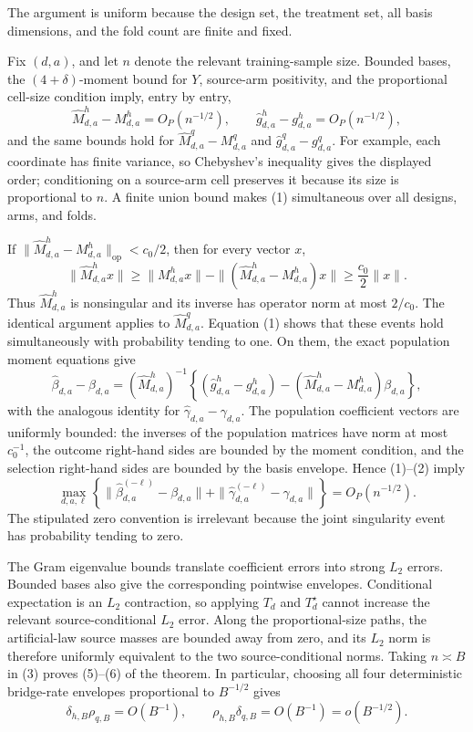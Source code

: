 The argument is uniform because the design set, the treatment set, all basis dimensions, and the fold count are finite and fixed.

Fix \((d,a)\), and let \(n\) denote the relevant training-sample size.  Bounded bases, the \((4+\delta)\)-moment bound for \(Y\), source-arm positivity, and the proportional cell-size condition imply, entry by entry,
\[
 \widehat M^h_{d,a}-M^h_{d,a}=O_P(n^{-1/2}),
 \qquad
 \widehat g^h_{d,a}-g^h_{d,a}=O_P(n^{-1/2}),                  \tag{1}
\]
and the same bounds hold for \(\widehat M^q_{d,a}-M^q_{d,a}\) and \(\widehat g^q_{d,a}-g^q_{d,a}\).  For example, each coordinate has finite variance, so Chebyshev's inequality gives the displayed order; conditioning on a source-arm cell preserves it because its size is proportional to \(n\).  A finite union bound makes (1) simultaneous over all designs, arms, and folds.

If \(\|\widehat M^h_{d,a}-M^h_{d,a}\|_{\mathrm{op}}<c_0/2\), then for every vector \(x\),
\[
 \|\widehat M^h_{d,a}x\|
 \ge \|M^h_{d,a}x\|
      -\|(\widehat M^h_{d,a}-M^h_{d,a})x\|
 \ge \frac{c_0}{2}\|x\|.
\]
Thus \(\widehat M^h_{d,a}\) is nonsingular and its inverse has operator norm at most \(2/c_0\).  The identical argument applies to \(\widehat M^q_{d,a}\).  Equation (1) shows that these events hold simultaneously with probability tending to one.  On them, the exact population moment equations give
\[
 \widehat\beta_{d,a}-\beta_{d,a}
 =(\widehat M^h_{d,a})^{-1}
 \left\{(\widehat g^h_{d,a}-g^h_{d,a})
 -(\widehat M^h_{d,a}-M^h_{d,a})\beta_{d,a}\right\},        \tag{2}
\]
with the analogous identity for \(\widehat\gamma_{d,a}-\gamma_{d,a}\).  The population coefficient vectors are uniformly bounded: the inverses of the population matrices have norm at most \(c_0^{-1}\), the outcome right-hand sides are bounded by the moment condition, and the selection right-hand sides are bounded by the basis envelope.  Hence (1)--(2) imply
\[
 \max_{d,a,\ell}\left\{
 \|\widehat\beta_{d,a}^{(-\ell)}-\beta_{d,a}\|
 +\|\widehat\gamma_{d,a}^{(-\ell)}-\gamma_{d,a}\|
 \right\}=O_P(n^{-1/2}).                                    \tag{3}
\]
The stipulated zero convention is irrelevant because the joint singularity event has probability tending to zero.

The Gram eigenvalue bounds translate coefficient errors into strong \(L_2\) errors.  Bounded bases also give the corresponding pointwise envelopes.  Conditional expectation is an \(L_2\) contraction, so applying \(T_d\) and \(T_d^\star\) cannot increase the relevant source-conditional \(L_2\) error.  Along the proportional-size paths, the artificial-law source masses are bounded away from zero, and its \(L_2\) norm is therefore uniformly equivalent to the two source-conditional norms.  Taking \(n\asymp B\) in (3) proves (5)--(6) of the theorem.  In particular, choosing all four deterministic bridge-rate envelopes proportional to \(B^{-1/2}\) gives
\[
 \delta_{h,B}\rho_{q,B}=O(B^{-1}),
 \qquad
 \rho_{h,B}\delta_{q,B}=O(B^{-1})=o(B^{-1/2}).               \tag{4}
\]

